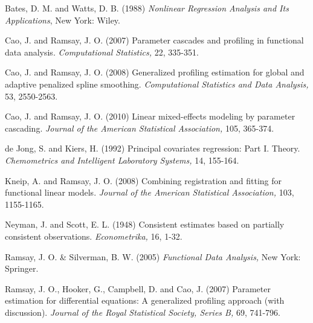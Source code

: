\documentclass[12pt]{article}
\begin{document}
\begin{description}

\item Bates, D. M.  and Watts, D. B. (1988) \emph{Nonlinear Regression Analysis and Its Applications},
    New York: Wiley.

\item Cao, J. and Ramsay, J. O. (2007) Parameter cascades and profiling in functional data analysis. \emph{Computational Statistics,} 22, 335-351.

\item Cao, J. and Ramsay, J. O. (2008) Generalized profiling estimation for global and adaptive penalized spline smoothing. \emph{Computational Statistics and Data Analysis,} 53, 2550-2563.

\item Cao, J. and Ramsay, J. O. (2010) Linear mixed-effects modeling by parameter cascading. \emph{Journal of the American Statistical Association,} 105, 365-374.

\item de Jong, S. and Kiers, H. (1992) Principal covariates regression: Part I. Theory.  \emph{Chemometrics and Intelligent Laboratory Systems,} 14, 155-164.

\item Kneip, A. and Ramsay, J. O. (2008) Combining registration and fitting for functional linear models.  \emph{Journal of the American Statistical Association,} 103, 1155-1165.

\item Neyman, J. and Scott, E. L. (1948) Consistent estimates based on partially consistent observations. \emph{Econometrika,} 16, 1-32.

\item Ramsay, J. O. \& Silverman, B. W. (2005) {\em Functional Data Analysis,} New York: Springer.

\item Ramsay, J. O., Hooker, G., Campbell, D. and Cao, J. (2007) Parameter estimation for differential equations: A generalized profiling approach (with discussion). \emph{Journal of the Royal Statistical Society, Series B,} 69, 741-796.

\end{description}
\end{document}
